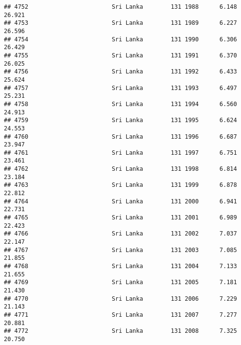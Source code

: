 \documentclass[
]{article}
\begin{document}
\begin{verbatim}
## 4752                        Sri Lanka        131 1988      6.148     26.921
## 4753                        Sri Lanka        131 1989      6.227     26.596
## 4754                        Sri Lanka        131 1990      6.306     26.429
## 4755                        Sri Lanka        131 1991      6.370     26.025
## 4756                        Sri Lanka        131 1992      6.433     25.624
## 4757                        Sri Lanka        131 1993      6.497     25.231
## 4758                        Sri Lanka        131 1994      6.560     24.913
## 4759                        Sri Lanka        131 1995      6.624     24.553
## 4760                        Sri Lanka        131 1996      6.687     23.947
## 4761                        Sri Lanka        131 1997      6.751     23.461
## 4762                        Sri Lanka        131 1998      6.814     23.184
## 4763                        Sri Lanka        131 1999      6.878     22.812
## 4764                        Sri Lanka        131 2000      6.941     22.731
## 4765                        Sri Lanka        131 2001      6.989     22.423
## 4766                        Sri Lanka        131 2002      7.037     22.147
## 4767                        Sri Lanka        131 2003      7.085     21.855
## 4768                        Sri Lanka        131 2004      7.133     21.655
## 4769                        Sri Lanka        131 2005      7.181     21.430
## 4770                        Sri Lanka        131 2006      7.229     21.143
## 4771                        Sri Lanka        131 2007      7.277     20.881
## 4772                        Sri Lanka        131 2008      7.325     20.750
## 4773                        Sri Lanka        131 2009      7.373     20.541
## 4774                        Sri Lanka        131 2010      7.421     20.580
## 4775                        Sri Lanka        131 2011      7.421         NA
## 4776                        Sri Lanka        131 2012      7.421         NA
## 4777                        Sri Lanka        131 2013      7.421         NA
## 4778                        Sri Lanka        131 2014      7.421         NA
## 4779                        Sri Lanka        131 2015      7.421         NA
## 4780                        Sri Lanka        131 2016      7.421         NA
## 4781                        Sri Lanka        131 2017      7.421         NA
## 4782                        Sri Lanka        131 2018      7.421         NA
## 4783                        Sri Lanka        131 2019      7.421         NA
## 4784                        Sri Lanka        131 2020      7.421         NA

\end{verbatim}
\end{document}
